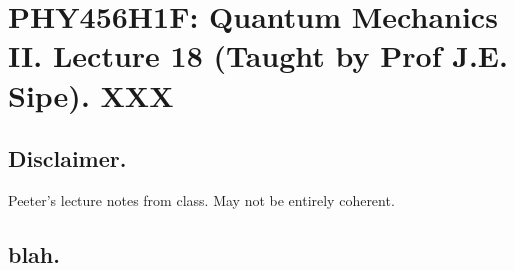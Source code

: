 
%

\chapter{PHY456H1F: Quantum Mechanics II.  Lecture 18 (Taught by Prof J.E. Sipe).  XXX}
\label{chap:qmTwoL18}
{}
\date{Nov 12, 2011}

\beginArtWithToc

\section{Disclaimer.}

Peeter's lecture notes from class.  May not be entirely coherent.

\section{blah.}

\cite{desai2009quantum}

\EndArticle
